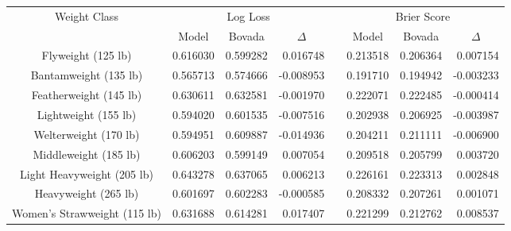\documentclass[12pt,twoside]{report}
\begin{document}
\begin{table}[!htb]
\footnotesize
\centering
\begin{tabular}{@{}cccrlccr@{}}
\toprule
\multirow{2}{*}{Weight Class}  & \multicolumn{3}{c}{Log Loss}                       & \multicolumn{1}{c}{\multirow{2}{*}{}} & \multicolumn{3}{c}{Brier Score}                    \\ \cmidrule(lr){2-4} \cmidrule(l){6-8} 
                               & Model    & Bovada   & \multicolumn{1}{c}{$\Delta$} & \multicolumn{1}{c}{}                  & Model    & Bovada   & \multicolumn{1}{c}{$\Delta$} \\ \midrule
Flyweight (125 lb)             & 0.616030 & 0.599282 & 0.016748                     & \multicolumn{1}{c}{}                  & 0.213518 & 0.206364 & 0.007154                     \\
Bantamweight (135 lb)          & 0.565713 & 0.574666 & -0.008953                    &                                       & 0.191710 & 0.194942 & -0.003233                    \\
Featherweight (145 lb)         & 0.630611 & 0.632581 & -0.001970                    &                                       & 0.222071 & 0.222485 & -0.000414                    \\
Lightweight (155 lb)           & 0.594020 & 0.601535 & -0.007516                    &                                       & 0.202938 & 0.206925 & -0.003987                    \\
Welterweight (170 lb)          & 0.594951 & 0.609887 & -0.014936                    &                                       & 0.204211 & 0.211111 & -0.006900                    \\
Middleweight (185 lb)          & 0.606203 & 0.599149 & 0.007054                     &                                       & 0.209518 & 0.205799 & 0.003720                     \\
Light Heavyweight (205 lb)     & 0.643278 & 0.637065 & 0.006213                     &                                       & 0.226161 & 0.223313 & 0.002848                     \\
Heavyweight (265 lb)           & 0.601697 & 0.602283 & -0.000585                    &                                       & 0.208332 & 0.207261 & 0.001071                     \\
Women's Strawweight (115 lb)   & 0.631688 & 0.614281 & 0.017407                     &                                       & 0.221299 & 0.212762 & 0.008537                     \\

\end{tabular}
\end{table}
\end{document}
